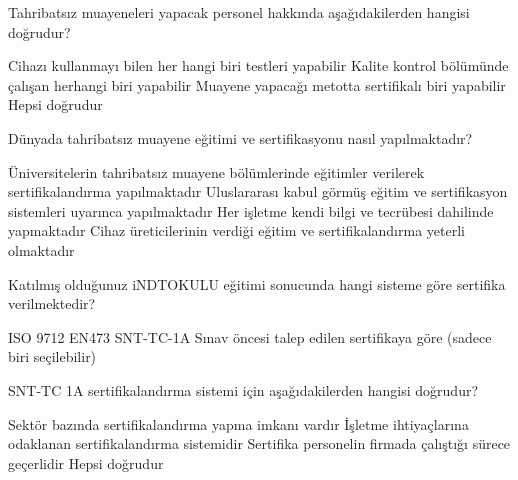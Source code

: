 
\begin{question}[subtitle=]
	Tahribatsız muayeneleri yapacak personel hakkında aşağıdakilerden hangisi doğrudur?
	
	\begin{tasks}
		\task	Cihazı kullanmayı bilen her hangi biri testleri yapabilir
		\task	Kalite kontrol bölümünde çalışan herhangi biri yapabilir
		\task	Muayene yapacağı metotta sertifikalı biri yapabilir \correct
		\task	Hepsi doğrudur

	\end{tasks}
\end{question}
\begin{solution}
	\correct
\end{solution}

\begin{question}[subtitle=]
	Dünyada tahribatsız muayene eğitimi ve sertifikasyonu nasıl yapılmaktadır?
	
	\begin{tasks}
		\task	Üniversitelerin tahribatsız muayene bölümlerinde eğitimler verilerek sertifikalandırma yapılmaktadır
		\task	Uluslararası kabul görmüş eğitim ve sertifikasyon sistemleri uyarınca yapılmaktadır \correct
		\task	Her işletme kendi bilgi ve tecrübesi dahilinde yapmaktadır
		\task	Cihaz üreticilerinin verdiği eğitim ve sertifikalandırma yeterli olmaktadır
	\end{tasks}
\end{question}
\begin{solution}
	\correct
\end{solution}

\begin{question}[subtitle=]
	Katılmış olduğunuz iNDTOKULU eğitimi sonucunda hangi sisteme göre sertifika verilmektedir?
	
	\begin{tasks}
		\task ISO 9712
		\task EN473
		\task SNT-TC-1A \correct
		\task Sınav öncesi talep edilen sertifikaya göre (sadece biri seçilebilir)

	\end{tasks}
\end{question}
\begin{solution}
	\correct
\end{solution}

\begin{question}[subtitle=]
	SNT-TC 1A sertifikalandırma sistemi için aşağıdakilerden hangisi doğrudur?
	
	\begin{tasks}
		\task Sektör bazında  sertifikalandırma yapma imkanı vardır
		\task İşletme ihtiyaçlarına odaklanan sertifikalandırma sistemidir
		\task Sertifika personelin firmada çalıştığı sürece geçerlidir
		\task Hepsi doğrudur \correct
		
	\end{tasks}
\end{question}
\begin{solution}
	\correct
\end{solution}


